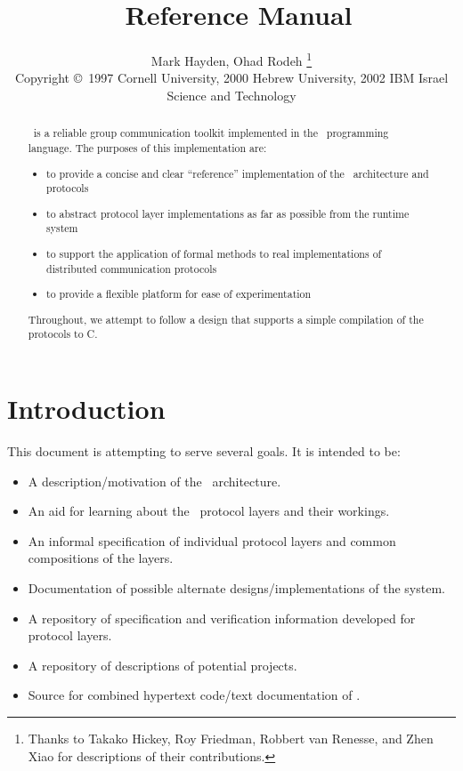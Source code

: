 \documentclass[11pt]{article}
\title{\ensemble\ Reference Manual}
\author{Mark Hayden, Ohad Rodeh 
\thanks{Thanks to Takako Hickey, Roy Friedman, Robbert van Renesse,
and Zhen Xiao for descriptions of their contributions.} \\
\small{Copyright \copyright\ 1997 Cornell University,
                             2000 Hebrew  University,
                             2002 IBM Israel Science and Technology }
}
\begin{document}
\maketitle

\begin{abstract}
\ensemble\ is a reliable group communication toolkit implemented in the
\caml\ programming language.  The purposes of this implementation are:
\begin{itemize}
\item 
to provide a concise and clear ``reference'' implementation of the \ensemble\
architecture and protocols
\item 
to abstract protocol layer implementations as far as possible from the
runtime system
\item
to support the application of formal methods to real implementations of
distributed communication protocols
\item 
to provide a flexible platform for ease of experimentation
\end{itemize}
Throughout, we attempt to follow a design that supports a simple
compilation of the protocols to C.
\end{abstract}

\newpage
\tableofcontents
\newpage

\section{Introduction}

This document is attempting to serve several goals.  It is intended to be:
\begin{itemize}
\item
A description/motivation of the \ensemble\ architecture.
\item
An aid for learning about the \ensemble\ protocol layers and their workings.
\item
An informal specification of individual protocol layers and common
compositions of the layers.
\item
Documentation of possible alternate designs/implementations of the system.
\item
A repository of specification and verification information developed for
protocol layers.
\item
A repository of descriptions of potential projects.
\item
Source for combined hypertext code/text documentation of \ensemble.
\end{itemize}
\end{document}
